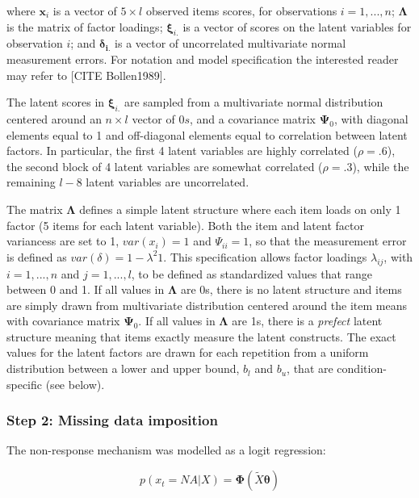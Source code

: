 	where $\bm{x}_i$ is a vector of $5 \times l$ observed items scores, for observations $i = 1, ..., n$;
	$\bm{\Lambda}$ is the matrix of factor loadings; $\bm{\xi}_{i.}$ is a vector of scores on the
	latent variables for observation $i$; and $\bm{\delta_{i.}}$ is a vector of uncorrelated multivariate 
	normal measurement errors. 
	For notation and model specification the interested reader may refer to [CITE Bollen1989].

	The latent scores in $\bm{\xi}_{i.}$ are sampled from a multivariate normal distribution centered around 
	an $n \times l$ vector of $0s$, and a covariance matrix $\bm{\Psi}_0$, with diagonal elements equal to 1 
	and off-diagonal elements equal to correlation between latent factors. In particular, the first 4 latent 
	variables are highly correlated ($\rho = .6$), the second block of 4 latent variables are somewhat 
	correlated ($\rho = .3$), while the remaining $l-8$ latent variables are uncorrelated.

	The matrix $\bm{\Lambda}$ defines a simple latent structure where each item loads on only 1 factor (5 items 
	for each latent variable).
	Both the item and latent factor variancess are set to 1, $var(x_i) = 1$ and $\Psi_{ii} = 1$, so that 
	the measurement error is defined as $var(\delta) = 1 - \lambda^{2} 1$. 
	This specification allows factor loadings $\lambda_{ij}$, with $i = 1, ..., n$ and $j = 1, ..., l$, to be
	defined as standardized values that range between 0 and 1.
	If all values in $\bm{\Lambda}$ are 0s, there is no latent structure and items are simply drawn from  
	multivariate distribution centered around the item means with covariance matrix $\bm{\Psi}_0$.
	If all values in $\bm{\Lambda}$ are 1s, there is a \emph{prefect} latent structure meaning that items
	exactly measure the latent constructs.
	The exact values for the latent factors are drawn for each repetition from a uniform distribution between
	a lower and upper bound, $b_l$ and $b_u$, that are condition-specific (see below).

\subsubsection{Step 2: Missing data imposition} \label{sub_missing}

	The non-response mechanism was modelled as a logit regression:

	\begin{equation} \label{eqn:rm}
		p(x_t = NA | X) = \bm{\Phi}(\tilde{X}\bm{\theta})
	\end{equation}

